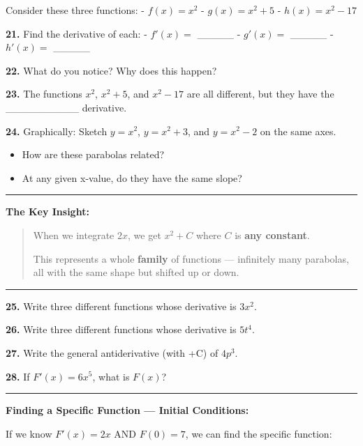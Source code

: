 \documentclass[
  11pt,
]{article}
\providecommand{\tightlist}{%
  \setlength{\itemsep}{0pt}\setlength{\parskip}{0pt}}
\begin{document}
Consider these three functions: - \(f(x) = x^2\) - \(g(x) = x^2 + 5\) -
\(h(x) = x^2 - 17\)

\textbf{21.} Find the derivative of each: - \(f'(x) ={}\) \_\_\_\_\_ -
\(g'(x) ={}\) \_\_\_\_\_ - \(h'(x) ={}\) \_\_\_\_\_

\textbf{22.} What do you notice? Why does this happen?

\textbf{23.} The functions \(x^2\), \(x^2 + 5\), and \(x^2 - 17\) are
all different, but they have the \_\_\_\_\_\_\_\_\_\_ derivative.

\textbf{24.} Graphically: Sketch \(y = x^2\), \(y = x^2 + 3\), and
\(y = x^2 - 2\) on the same axes.

\begin{itemize}
\tightlist
\item
  How are these parabolas related?
\item
  At any given x-value, do they have the same slope?
\end{itemize}

\begin{center}\rule{0.5\linewidth}{0.5pt}\end{center}

\textbf{The Key Insight:}

\begin{quote}
When we integrate \(2x\), we get \(x^2 + C\) where \(C\) is \textbf{any
constant}.

This represents a whole \textbf{family} of functions --- infinitely many
parabolas, all with the same shape but shifted up or down.
\end{quote}

\begin{center}\rule{0.5\linewidth}{0.5pt}\end{center}

\textbf{25.} Write three different functions whose derivative is
\(3x^2\).

\textbf{26.} Write three different functions whose derivative is
\(5t^4\).

\textbf{27.} Write the general antiderivative (with +C) of \(4p^3\).

\textbf{28.} If \(F'(x) = 6x^5\), what is \(F(x)\)?

\begin{center}\rule{0.5\linewidth}{0.5pt}\end{center}

\textbf{Finding a Specific Function --- Initial Conditions:}

If we know \(F'(x) = 2x\) AND \(F(0) = 7\), we can find the specific
function:
\end{document}
